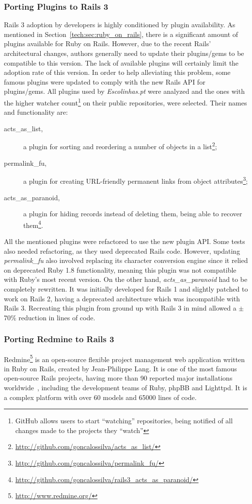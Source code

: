 \subsubsection{Porting Plugins to Rails 3}
Rails 3 adoption by developers is highly conditioned by plugin availability. As mentioned in Section~\ref{tech:sec:ruby_on_rails}, there is a significant amount of plugins available for Ruby on Rails. However, due to the recent Rails' architectural changes, authors generally need to update their plugins/gems to be compatible to this version. The lack of available plugins will certainly limit the adoption rate of this version. In order to help alleviating this problem, some famous plugins were updated to comply with the new Rails API for plugins/gems. All plugins used by \textit{Escolinhas.pt} were analyzed and the ones with the higher watcher count\footnote{GitHub allows users to start ``watching'' repositories, being notified of all changes made to the projects they ``watch''} on their public repositories, were selected. Their names and functionality are:
\begin{description}
  \item[acts\_as\_list,] a plugin for sorting and reordering a number of objects in a list\footnote{\url{http://github.com/goncalossilva/acts_as_list/}};
  \item[permalink\_fu,] a plugin for creating URL-friendly permanent links from object attributes\footnote{\url{http://github.com/goncalossilva/permalink_fu/}};
  \item[acts\_as\_paranoid,] a plugin for hiding records instead of deleting them, being able to recover them\footnote{\url{http://github.com/goncalossilva/rails3_acts_as_paranoid/}}.
\end{description}
All the mentioned plugins were refactored to use the new plugin API. Some tests also needed refactoring, as they used deprecated Rails code. However, updating \textit{permalink\_fu} also involved replacing its character conversion engine since it relied on deprecated Ruby 1.8 functionality, meaning this plugin was not compatible with Ruby's most recent version. On the other hand, \textit{acts\_as\_paranoid} had to be completely rewritten. It was initially developed for Rails 1 and slightly patched to work on Rails 2, having a deprecated architecture which was incompatible with Rails 3. Recreating this plugin from ground up with Rails 3 in mind allowed a $\pm$70\% reduction in lines of code.


\subsubsection{Porting Redmine to Rails 3}
Redmine\footnote{\url{http://www.redmine.org/}} is an open-source flexible project management web application written in Ruby on Rails, created by Jean-Philippe Lang. It is one of the most famous open-source Rails projects, having more than 90 reported major installations worldwide~\cite{redmine_installations}, including the development teams of Ruby, phpBB and Lighttpd. It is a complex platform with over 60 models and 65000 lines of code.


